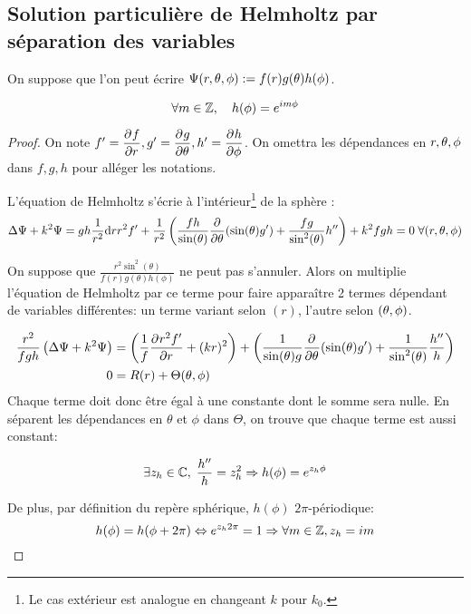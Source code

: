 \subsection{Solution particulière de Helmholtz par séparation des variables}
\begin{hyp}
On suppose que l'on peut écrire \(\Psi(\rtp) : = f(r)g(\theta)h(\phi)\). 
\end{hyp}
\begin{prop}
\begin{equation}
\forall m \in \ZZ, \quad h(\phi) = e^{im\phi}
\end{equation}
\end{prop}
\begin{proof}
On note \(f' =\ddr{r}{f}, g' = \ddr{\theta}{g} , h' = \ddr{\phi}{h}\). On omettra les dépendances en \(\rtp\) dans \(f,g,h\) pour alléger les notations.

L'équation de Helmholtz s'écrie à l'intérieur\footnote{Le cas extérieur est analogue en changeant \(k\) pour \(k_0\).} de la sphère : 
\begin{equation}\label{eq:helm:helm}
  \Delta \Psi + k^2 \Psi = gh\frac{1}{r^2}\dd{r}{r^2f'} + \frac{1}{r^2}\left(\frac{fh}{\sin(\theta)}\ddr{\theta}{}(\sin(\theta)g')+\frac{fg}{\sin^2(\theta)}h''\right) + k^2 fgh = 0 \; \forall (r,\tp)
\end{equation}

On suppose que \( \frac{r^2\sin^2(\theta)}{f(r)g(\theta)h(\phi)}\) ne peut pas s'annuler. Alors on multiplie l'équation de Helmholtz par ce terme pour faire apparaître 2 termes dépendant de variables différentes: un terme variant selon \((r)\), l'autre selon \((\tp)\). 

\begin{align*}
\frac{r^2}{fgh} \left(\Delta \Psi + k^2 \Psi\right) &= 
\left(\frac{1}{f}\ddr{r}{r^2f'} + (kr)^2\right) + 
\left(\frac{1}{ \sin(\theta)g} \ddr{\theta}{}(\sin(\theta)g') +  \frac{1}{ \sin^2(\theta)}\frac{h''}{h} \right)\\
0 &=R(r) + \Theta(\tp)
\end{align*}
Chaque terme doit donc être égal à une constante dont le somme sera nulle. En séparent les dépendances en \(\theta\) et \(\phi\) dans \(\Theta\), on trouve que chaque terme est aussi constant:

\[ 
\exists z_h \in \CC,\; \frac{h''}{h} = z_h^2 \Rightarrow h(\phi) = e^{z_h\phi}
\]

De plus, par définition du repère sphérique, \(h(\phi)\) \(2\pi\)-périodique:
\[
h(\phi) = h(\phi + 2\pi) \Leftrightarrow e^{z_h2\pi}= 1 \Rightarrow \forall m \in \ZZ, z_h = im
\]
\end{proof}

